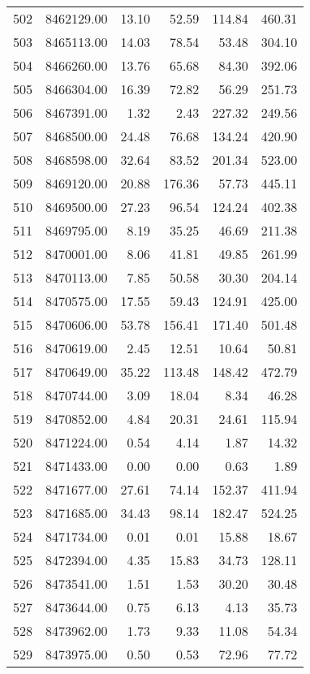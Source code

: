 \begin{table}[ht]
\begin{tabular}{rrrrrr}
  502 & 8462129.00 & 13.10 & 52.59 & 114.84 & 460.31 \\ 
  503 & 8465113.00 & 14.03 & 78.54 & 53.48 & 304.10 \\ 
  504 & 8466260.00 & 13.76 & 65.68 & 84.30 & 392.06 \\ 
  505 & 8466304.00 & 16.39 & 72.82 & 56.29 & 251.73 \\ 
  506 & 8467391.00 & 1.32 & 2.43 & 227.32 & 249.56 \\ 
  507 & 8468500.00 & 24.48 & 76.68 & 134.24 & 420.90 \\ 
  508 & 8468598.00 & 32.64 & 83.52 & 201.34 & 523.00 \\ 
  509 & 8469120.00 & 20.88 & 176.36 & 57.73 & 445.11 \\ 
  510 & 8469500.00 & 27.23 & 96.54 & 124.24 & 402.38 \\ 
  511 & 8469795.00 & 8.19 & 35.25 & 46.69 & 211.38 \\ 
  512 & 8470001.00 & 8.06 & 41.81 & 49.85 & 261.99 \\ 
  513 & 8470113.00 & 7.85 & 50.58 & 30.30 & 204.14 \\ 
  514 & 8470575.00 & 17.55 & 59.43 & 124.91 & 425.00 \\ 
  515 & 8470606.00 & 53.78 & 156.41 & 171.40 & 501.48 \\ 
  516 & 8470619.00 & 2.45 & 12.51 & 10.64 & 50.81 \\ 
  517 & 8470649.00 & 35.22 & 113.48 & 148.42 & 472.79 \\ 
  518 & 8470744.00 & 3.09 & 18.04 & 8.34 & 46.28 \\ 
  519 & 8470852.00 & 4.84 & 20.31 & 24.61 & 115.94 \\ 
  520 & 8471224.00 & 0.54 & 4.14 & 1.87 & 14.32 \\ 
  521 & 8471433.00 & 0.00 & 0.00 & 0.63 & 1.89 \\ 
  522 & 8471677.00 & 27.61 & 74.14 & 152.37 & 411.94 \\ 
  523 & 8471685.00 & 34.43 & 98.14 & 182.47 & 524.25 \\ 
  524 & 8471734.00 & 0.01 & 0.01 & 15.88 & 18.67 \\ 
  525 & 8472394.00 & 4.35 & 15.83 & 34.73 & 128.11 \\ 
  526 & 8473541.00 & 1.51 & 1.53 & 30.20 & 30.48 \\ 
  527 & 8473644.00 & 0.75 & 6.13 & 4.13 & 35.73 \\ 
  528 & 8473962.00 & 1.73 & 9.33 & 11.08 & 54.34 \\ 
  529 & 8473975.00 & 0.50 & 0.53 & 72.96 & 77.72 \\ 

\end{tabular}
\end{table}
